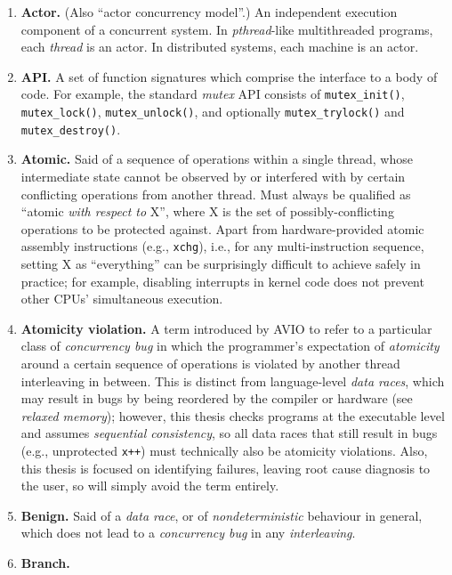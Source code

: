 \begin{enumerate}
	\item {\bf Actor.}
		(Also ``actor concurrency model''.)
		An independent execution component of a concurrent system.
		In {\em pthread}-like multithreaded programs, each {\em thread} is an actor.
		In distributed systems, each machine is an actor.
	\item {\bf API.}
		A set of function signatures which comprise the interface to a body of code.
		For example, the standard {\em mutex} API consists of
		{\tt mutex\_init()}, {\tt mutex\_lock()}, {\tt mutex\_unlock()},
		and optionally {\tt mutex\_trylock()} and {\tt mutex\_destroy()}.
	\item {\bf Atomic.}
		Said of a sequence of operations within a single thread,
		whose intermediate state cannot be observed by or interfered with
		by certain conflicting operations from another thread.
		Must always be qualified as ``atomic {\em with respect to} X'',
		where X is the set of possibly-conflicting operations to be protected against.
		Apart from hardware-provided atomic assembly instructions (e.g., {\tt xchg}),
		i.e., for any multi-instruction sequence,
		setting X as ``everything'' can be surprisingly difficult to achieve safely in practice;
		for example, disabling interrupts in kernel code does not prevent other CPUs' simultaneous execution.
	\item {\bf Atomicity violation.}
		A term introduced by AVIO \cite{avio} to refer to a particular class of {\em concurrency bug}
		in which the programmer's expectation of {\em atomicity} around a certain sequence of operations
		is violated by another thread interleaving in between.
		This is distinct from language-level {\em data races},
		which may result in bugs by being reordered by the compiler or hardware (see {\em relaxed memory});
		however, this thesis checks programs at the executable level and assumes {\em sequential consistency},
		so all data races that still result in bugs (e.g., unprotected {\tt x++})
		must technically also be atomicity violations.
		Also, this thesis is focused on identifying failures,
		leaving root cause diagnosis to the user,
		so will simply avoid the term entirely.
	\item {\bf Benign.}
		Said of a {\em data race}, or of {\em nondeterministic} behaviour in general,
		which does not lead to a {\em concurrency bug} in any {\em interleaving}.
	\item {\bf Branch.}

\end{enumerate}
